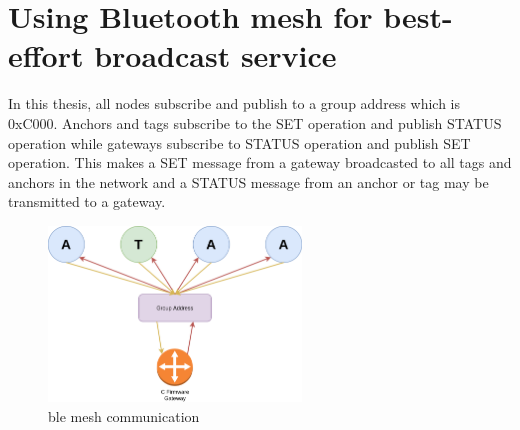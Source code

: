 \documentclass[\main/main.tex]{subfiles}
\begin{document}
\section{Using Bluetooth mesh for best-effort broadcast service}
In this thesis, all nodes subscribe and publish to a group address which is 0xC000. Anchors and tags subscribe to the SET operation and publish STATUS operation while gateways subscribe to STATUS operation and publish SET operation. This makes a SET message from a gateway broadcasted to all tags and anchors in the network and a STATUS message from an anchor or tag may be transmitted to a gateway.

\begin{figure}[H]
    \begin{center}
        \includegraphics[width=0.6\textwidth]{ble_mesh_comunication.png}
    \end{center}
    \caption{ble mesh communication}
    \label{fig:ble_mesh_comunication}
\end{figure}

\bib
\end{document}
